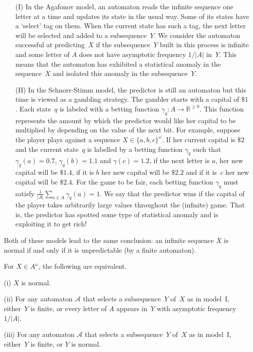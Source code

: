 \documentclass[11pt]{article}
\newcommand{\A}{\mathcal{A}}
\newcommand{\R}{\mathbb{R}}
\begin{document}
\begin{itemize}
\item[(I)] In the Agafonov model, an automaton reads the infinite sequence one letter at a time and updates its state in the usual way. Some of its states have a `select' tag on them. When the current state has such a tag, the next letter will be selected and added to a subsequence~$Y$. We consider the automaton successful at predicting~$X$ if the subsequence~$Y$ built in this process is infinite and some letter of $A$ does not have asymptotic frequency $1/|A|$ in~$Y$. This means that the automaton has exhibited a statistical anomaly in the sequence~$X$ and isolated this anomaly in the subsequence~$Y$. 

\item[(II)] In the Schnorr-Stimm model, the predictor is still an automaton but this time is viewed as a gambling strategy. The gambler starts with a capital of $\$1$. Each state~$q$ is labeled with a betting function $\gamma_q: A \rightarrow \R^{\geq 0}$. This function represents the amount by which the predictor would like her capital to be multiplied by depending on the value of the next bit. For example, suppose the player plays against a sequence $X \in \{a,b,c\}^\omega$. If her current capital is $\$2$ and  the current state~$q$ is labelled by a betting function $\gamma_q$ such that $\gamma_q(a)=0.7$, $\gamma_q(b)=1.1$ and $\gamma(c)=1.2$, if the next letter is $a$, her new capital will be $\$1.4$, if it is $b$ her new capital will be $\$ 2.2$ and if it is~$c$ her new capital will be $\$2.4$. For the game to be fair, each betting function $\gamma_q$ must satisfy $\frac{1}{|A|}\sum_{a \in A} \gamma_q(a) = 1$. We say that the predictor wins if the capital of the player takes arbitrarily large values throughout the (infinite) game. That is, the predictor has spotted some type of statistical anomaly and is exploiting it to get rich!
\end{itemize}


Both of these models lead to the same conclusion: an infinite sequence $X$ is normal if and only if it is unpredictable (by a finite automaton). 

\begin{theorem}
For $X \in A^\omega$, the following are equivalent.
\item[(i)] $X$ is normal. 
\item[(ii)] For any automaton $\A$ that selects a subsequence~$Y$ of~$X$ as in model~I, either~$Y$ is finite, or every letter of $A$ appears in~$Y$ with asymptotic frequency $1/|A|$.
\item[(iii)] For any automaton $\A$ that selects a subsequence~$Y$ of~$X$ as in model~I, either~$Y$ is finite, or $Y$ is normal. 
\end{theorem}
\end{document}
